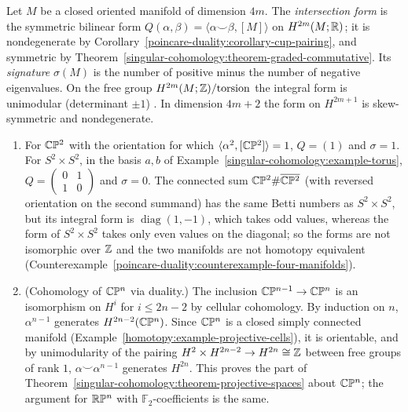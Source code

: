 \begin{definition}\label{poincare-duality:definition-intersection-form}
Let $M$ be a closed oriented manifold of dimension $4m$. The \emph{intersection form} is the symmetric bilinear form $Q(\alpha, \beta) = \langle \alpha \smile \beta, [M] \rangle$ on
$H^{2m}(M; \mathbb{R})$; it is nondegenerate by Corollary~\ref{poincare-duality:corollary-cup-pairing}, and symmetric by Theorem~\ref{singular-cohomology:theorem-graded-commutative}. Its
\emph{signature} $\sigma(M)$ is the number of positive minus the number of negative eigenvalues. On the free group $H^{2m}(M; \mathbb{Z})/\mathrm{torsion}$ the integral form is
unimodular (determinant $\pm 1$) \cite[Proposition 3.38]{hatcher-at}. In dimension $4m + 2$ the form on $H^{2m+1}$ is skew-symmetric and nondegenerate.
\end{definition}

\begin{example}\label{poincare-duality:example-intersection-forms}
\begin{enumerate}
\item For $\mathbb{C}\mathbb{P}^2$ with the orientation for which $\langle \alpha^2, [\mathbb{C}\mathbb{P}^2]\rangle = 1$, $Q = (1)$ and $\sigma = 1$. For $S^2 \times S^2$, in the basis $a, b$ of
Example~\ref{singular-cohomology:example-torus}, $Q = \left(\begin{smallmatrix} 0 & 1 \\ 1 & 0 \end{smallmatrix}\right)$ and $\sigma = 0$. The connected sum
$\mathbb{C}\mathbb{P}^2 \# \overline{\mathbb{C}\mathbb{P}^2}$ (with reversed orientation on the second summand) has the same Betti numbers as $S^2 \times S^2$, but its integral form is
$\operatorname{diag}(1, -1)$, which takes odd values, whereas the form of $S^2 \times S^2$ takes only even values on the diagonal; so the forms are not isomorphic over $\mathbb{Z}$
and the two manifolds are not homotopy equivalent (Counterexample~\ref{poincare-duality:counterexample-four-manifolds}).
\item (Cohomology of $\mathbb{C}\mathbb{P}^n$ via duality.) The inclusion $\mathbb{C}\mathbb{P}^{n-1} \to \mathbb{C}\mathbb{P}^n$ is an isomorphism on $H^i$ for $i \leq 2n - 2$ by cellular cohomology. By induction on $n$,
$\alpha^{n-1}$ generates $H^{2n-2}(\mathbb{C}\mathbb{P}^n)$. Since $\mathbb{C}\mathbb{P}^n$ is a closed simply connected manifold (Example~\ref{homotopy:example-projective-cells}), it is orientable, and by unimodularity of the pairing
$H^2 \times H^{2n-2} \to H^{2n} \cong \mathbb{Z}$ between free groups of rank $1$, $\alpha \smile \alpha^{n-1}$ generates $H^{2n}$. This proves the part of
Theorem~\ref{singular-cohomology:theorem-projective-spaces} about $\mathbb{C}\mathbb{P}^n$; the argument for $\mathbb{R}\mathbb{P}^n$ with $\mathbb{F}_2$-coefficients is the same.
\end{enumerate}
\end{example}

